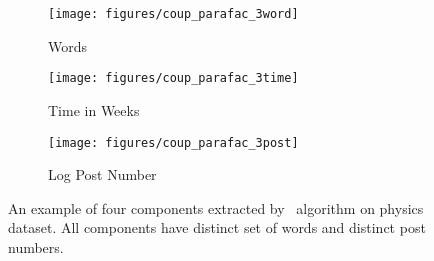 \begin{figure*}
         \begin{subfigure}[b]{0.31\textwidth}
                \texttt{[image: figures/coup\_parafac\_3word]}
                \caption{Words}
                \label{fig:coup_parafac_c3word}
        \end{subfigure}%
        \begin{subfigure}[b]{0.31\textwidth}
                \texttt{[image: figures/coup\_parafac\_3time]}
                \caption{Time in Weeks}
                \label{fig:coup_parafac_c3time}
        \end{subfigure}%
\begin{subfigure}[b]{0.31\textwidth}
                \texttt{[image: figures/coup\_parafac\_3post]}
                \caption{Log Post Number}
                \label{fig:coup_parafac_c3post}
        \end{subfigure}%
        \caption{\label{fig:coup_parafac}An example of four components extracted by \ourAlgo\ algorithm on physics dataset. All components have distinct set of words and distinct post numbers. }
\end{figure*}
\vspace{-0pt}

